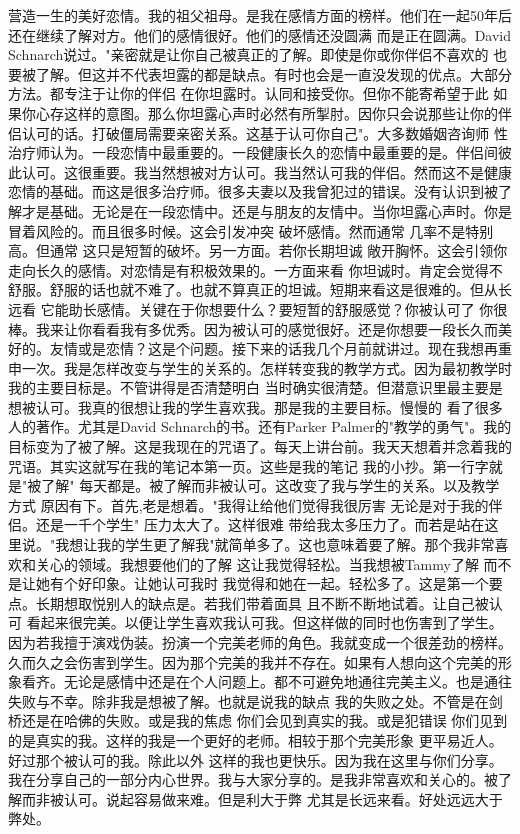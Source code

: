营造一生的美好恋情。我的祖父祖母。是我在感情方面的榜样。他们在一起50年后 还在继续了解对方。他们的感情很好。他们的感情还没圆满 而是正在圆满。David Schnarch说过。"亲密就是让你自己被真正的了解。即使是你或你伴侣不喜欢的 也要被了解。但这并不代表坦露的都是缺点。有时也会是一直没发现的优点。大部分方法。都专注于让你的伴侣 在你坦露时。认同和接受你。但你不能寄希望于此 如果你心存这样的意图。那么你坦露心声时必然有所掣肘。因你只会说那些让你的伴侣认可的话。打破僵局需要亲密关系。这基于认可你自己"。大多数婚姻咨询师 性治疗师认为。一段恋情中最重要的。一段健康长久的恋情中最重要的是。伴侣间彼此认可。这很重要。我当然想被对方认可。我当然认可我的伴侣。然而这不是健康恋情的基础。而这是很多治疗师。很多夫妻以及我曾犯过的错误。没有认识到被了解才是基础。无论是在一段恋情中。还是与朋友的友情中。当你坦露心声时。你是冒着风险的。而且很多时候。这会引发冲突 破坏感情。然而通常 几率不是特别高。但通常 这只是短暂的破坏。另一方面。若你长期坦诚 敞开胸怀。这会引领你走向长久的感情。对恋情是有积极效果的。一方面来看 你坦诚时。肯定会觉得不舒服。舒服的话也就不难了。也就不算真正的坦诚。短期来看这是很难的。但从长远看 它能助长感情。关键在于你想要什么？要短暂的舒服感觉？你被认可了 你很棒。我来让你看看我有多优秀。因为被认可的感觉很好。还是你想要一段长久而美好的。友情或是恋情？这是个问题。接下来的话我几个月前就讲过。现在我想再重申一次。我是怎样改变与学生的关系的。怎样转变我的教学方式。因为最初教学时 我的主要目标是。不管讲得是否清楚明白 当时确实很清楚。但潜意识里最主要是想被认可。我真的很想让我的学生喜欢我。那是我的主要目标。慢慢的 看了很多人的著作。尤其是David Schnarch的书。还有Parker Palmer的"教学的勇气"。我的目标变为了被了解。这是我现在的咒语了。每天上讲台前。我天天想着并念着我的咒语。其实这就写在我的笔记本第一页。这些是我的笔记 我的小抄。第一行字就是"被了解" 每天都是。被了解而非被认可。这改变了我与学生的关系。以及教学方式 原因有下。首先,老是想着。"我得让给他们觉得我很厉害 无论是对于我的伴侣。还是一千个学生" 压力太大了。这样很难 带给我太多压力了。而若是站在这里说。"我想让我的学生更了解我"就简单多了。这也意味着要了解。那个我非常喜欢和关心的领域。我想要他们的了解 这让我觉得轻松。当我想被Tammy了解 而不是让她有个好印象。让她认可我时 我觉得和她在一起。轻松多了。这是第一个要点。长期想取悦别人的缺点是。若我们带着面具 且不断不断地试着。让自己被认可 看起来很完美。以便让学生喜欢我认可我。但这样做的同时也伤害到了学生。因为若我擅于演戏伪装。扮演一个完美老师的角色。我就变成一个很差劲的榜样。久而久之会伤害到学生。因为那个完美的我并不存在。如果有人想向这个完美的形象看齐。无论是感情中还是在个人问题上。都不可避免地通往完美主义。也是通往失败与不幸。除非我是想被了解。也就是说我的缺点 我的失败之处。不管是在剑桥还是在哈佛的失败。或是我的焦虑 你们会见到真实的我。或是犯错误 你们见到的是真实的我。这样的我是一个更好的老师。相较于那个完美形象 更平易近人。好过那个被认可的我。除此以外 这样的我也更快乐。因为我在这里与你们分享。我在分享自己的一部分内心世界。我与大家分享的。是我非常喜欢和关心的。被了解而非被认可。说起容易做来难。但是利大于弊 尤其是长远来看。好处远远大于弊处。 

